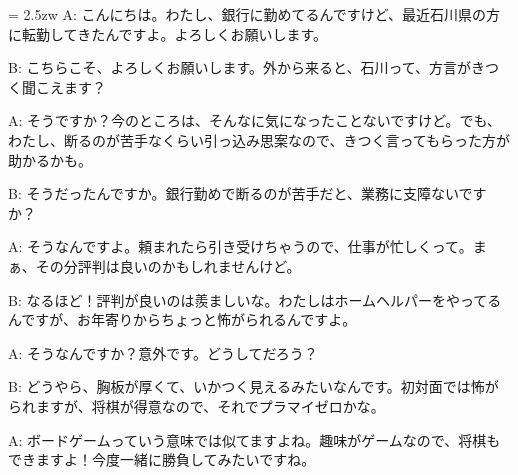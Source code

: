 \documentclass[11pt]{amsart}
\title{}
\author{}
\newenvironment{hangall}[1]{\hangindent = 2.5zw\everypar{\hangindent = 2.5zw}}{}
\begin{document}
\maketitle
\begin{hangall}{}%
A: こんにちは。わたし、銀行に勤めてるんですけど、最近石川県の方に転勤してきたんですよ。よろしくお願いします。



B: こちらこそ、よろしくお願いします。外から来ると、石川って、方言がきつく聞こえます？



A: そうですか？今のところは、そんなに気になったことないですけど。でも、わたし、断るのが苦手なくらい引っ込み思案なので、きつく言ってもらった方が助かるかも。



B: そうだったんですか。銀行勤めで断るのが苦手だと、業務に支障ないですか？



A: そうなんですよ。頼まれたら引き受けちゃうので、仕事が忙しくって。まぁ、その分評判は良いのかもしれませんけど。



B: なるほど！評判が良いのは羨ましいな。わたしはホームヘルパーをやってるんですが、お年寄りからちょっと怖がられるんですよ。



A: そうなんですか？意外です。どうしてだろう？



B: どうやら、胸板が厚くて、いかつく見えるみたいなんです。初対面では怖がられますが、将棋が得意なので、それでプラマイゼロかな。



A: ボードゲームっていう意味では似てますよね。趣味がゲームなので、将棋もできますよ！今度一緒に勝負してみたいですね。\end{hangall}
\end{document}
